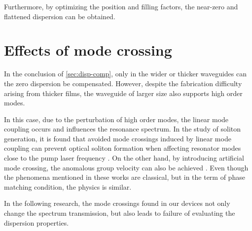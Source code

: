 


Furthermore, by optimizing the position and filling factors, the near-zero and flattened dispersion can be obtained. 


\section{Effects of mode crossing}

In the conclusion of \autoref{sec:disp-comp},
only in the wider or thicker waveguides can the zero dispersion be compensated. However, 
despite the fabrication difficulty arising from thicker films,
the waveguide of larger size also supports high order modes. 

In this case, due to the perturbation of high order modes, the linear mode coupling occurs and influences the resonance spectrum. 
In the study of soliton generation,
it is found that avoided mode crossings induced by linear mode coupling can prevent optical soliton formation when affecting resonator modes close to the pump laser frequency \cites{Herr2014a,Bao2018}. On the other hand, by introducing artificial mode crossing, the anomalous group velocity can also be achieved \cite{Kim2017}. Even though the phenomena mentioned in these works are classical, but in the term of phase matching condition, the physics is similar.

In the following research, the mode crossings found in our devices not only change the spectrum transmission, but also leads to failure of evaluating the dispersion properties.



